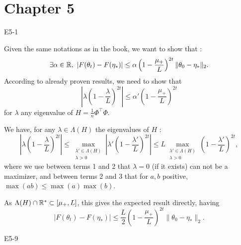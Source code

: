 \section{Chapter 5}
\begin{questions}

    \question E5-1
    
    \begin{solution}
Given the same notations as in the book, we want to show that : $$\exists \alpha \in \mathbb{R},~ |F(\theta_t)-F(\eta_*)| \leq \alpha \left( 1 - \frac{\mu_+}{L} \right)^{2t} \|\theta_0 - \eta_* \|_2.$$
According to already proven results, we need to show that $$|\lambda (1-\frac{\lambda}{L})^{2t}| \leq \alpha' \left( 1 - \frac{\mu_+}{L} \right)^{2t}$$
for $\lambda$ any eigenvalue of $H = \frac{1}{n} \Phi^\top \Phi$.

We have, for any $\lambda \in \Lambda(H)$ the eigenvalues of $H$ :
$$
\left|\lambda \left(1-\frac{\lambda}{L} \right)^{2t} \right| \leq \max_{\substack{\lambda' \in \Lambda(H) \\ \lambda > 0}} \left|\lambda' \left(1-\frac{\lambda'}{L} \right)^{2t} \right| \leq L \max_{\substack{\lambda' \in \Lambda(H) \\ \lambda > 0}} \left(1-\frac{\lambda'}{L} \right)^{2t},
$$
where we use between terms 1 and 2 that $\lambda = 0$ (if it exists) can not be a maximizer, and between terms 2 and 3 that for $a, b$ positive, $\max (ab) \leq \max (a)\max (b)$.

As $\Lambda(H) \cap \mathbb{R}^* \subset [\mu_+, L]$, this gives the expected result directly, having
$$
|F(\theta_t)-F(\eta_*)| \leq \frac{L}{2} \left( 1 - \frac{\mu_+}{L} \right)^{2t} \|\theta_0 - \eta_* \|_2.
$$
    \end{solution}
    
    \question E5-9

    \begin{solution}
\end{solution}
\end{questions}
